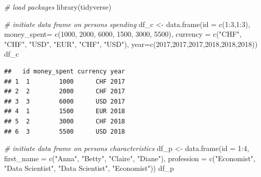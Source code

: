 \documentclass[
  12pt,
]{style/krantz}
\newenvironment{Shaded}{\begin{snugshade}}{\end{snugshade}}
\newcommand{\AttributeTok}[1]{\textcolor[rgb]{0.77,0.63,0.00}{#1}}
\newcommand{\CommentTok}[1]{\textcolor[rgb]{0.56,0.35,0.01}{\textit{#1}}}
\newcommand{\DecValTok}[1]{\textcolor[rgb]{0.00,0.00,0.81}{#1}}
\newcommand{\FunctionTok}[1]{\textcolor[rgb]{0.00,0.00,0.00}{#1}}
\newcommand{\NormalTok}[1]{#1}
\newcommand{\OtherTok}[1]{\textcolor[rgb]{0.56,0.35,0.01}{#1}}
\newcommand{\SpecialCharTok}[1]{\textcolor[rgb]{0.00,0.00,0.00}{#1}}
\newcommand{\StringTok}[1]{\textcolor[rgb]{0.31,0.60,0.02}{#1}}
\begin{document}
\begin{Shaded}
\begin{Highlighting}[]
\CommentTok{\# load packages}
\FunctionTok{library}\NormalTok{(tidyverse)}

\CommentTok{\# initiate data frame on persons\textquotesingle{} spending}
\NormalTok{df\_c }\OtherTok{\textless{}{-}} \FunctionTok{data.frame}\NormalTok{(}\AttributeTok{id =} \FunctionTok{c}\NormalTok{(}\DecValTok{1}\SpecialCharTok{:}\DecValTok{3}\NormalTok{,}\DecValTok{1}\SpecialCharTok{:}\DecValTok{3}\NormalTok{),}
                   \AttributeTok{money\_spent=} \FunctionTok{c}\NormalTok{(}\DecValTok{1000}\NormalTok{, }\DecValTok{2000}\NormalTok{, }\DecValTok{6000}\NormalTok{, }\DecValTok{1500}\NormalTok{, }\DecValTok{3000}\NormalTok{, }\DecValTok{5500}\NormalTok{),}
                   \AttributeTok{currency =} \FunctionTok{c}\NormalTok{(}\StringTok{"CHF"}\NormalTok{, }\StringTok{"CHF"}\NormalTok{, }\StringTok{"USD"}\NormalTok{, }\StringTok{"EUR"}\NormalTok{, }\StringTok{"CHF"}\NormalTok{, }\StringTok{"USD"}\NormalTok{),}
                   \AttributeTok{year=}\FunctionTok{c}\NormalTok{(}\DecValTok{2017}\NormalTok{,}\DecValTok{2017}\NormalTok{,}\DecValTok{2017}\NormalTok{,}\DecValTok{2018}\NormalTok{,}\DecValTok{2018}\NormalTok{,}\DecValTok{2018}\NormalTok{))}
\NormalTok{df\_c}
\end{Highlighting}
\end{Shaded}

\begin{verbatim}
##   id money_spent currency year
## 1  1        1000      CHF 2017
## 2  2        2000      CHF 2017
## 3  3        6000      USD 2017
## 4  1        1500      EUR 2018
## 5  2        3000      CHF 2018
## 6  3        5500      USD 2018
\end{verbatim}

\begin{Shaded}
\begin{Highlighting}[]
\CommentTok{\# initiate data frame on persons\textquotesingle{} characteristics}
\NormalTok{df\_p }\OtherTok{\textless{}{-}} \FunctionTok{data.frame}\NormalTok{(}\AttributeTok{id =} \DecValTok{1}\SpecialCharTok{:}\DecValTok{4}\NormalTok{,}
                   \AttributeTok{first\_name =} \FunctionTok{c}\NormalTok{(}\StringTok{"Anna"}\NormalTok{, }\StringTok{"Betty"}\NormalTok{, }\StringTok{"Claire"}\NormalTok{, }\StringTok{"Diane"}\NormalTok{),}
                   \AttributeTok{profession =} \FunctionTok{c}\NormalTok{(}\StringTok{"Economist"}\NormalTok{, }\StringTok{"Data Scientist"}\NormalTok{,}
                                  \StringTok{"Data Scientist"}\NormalTok{, }\StringTok{"Economist"}\NormalTok{))}
\NormalTok{df\_p}
\end{Highlighting}
\end{Shaded}
\end{document}
